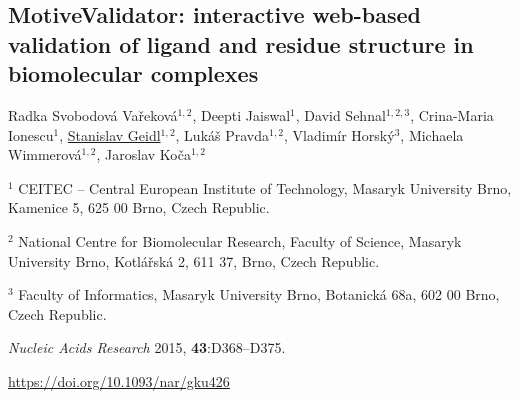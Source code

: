 \begin{center}
\section{\centering MotiveValidator: interactive
web-based validation of ligand and residue structure in biomolecular complexes}

Radka Svobodová Vařeková$^{1, 2}$,
Deepti Jaiswal$^1$,
David Sehnal$^{1, 2, 3}$,
Crina-Maria Ionescu$^1$,
\underline{Stanislav Geidl}$^{1, 2}$,
Lukáš Pravda$^{1, 2}$,
Vladimír Horský$^3$,
Michaela Wimmerová$^{1, 2}$,
Jaroslav Koča$^{1, 2}$

\vspace{1cm}

$^1$ CEITEC -- Central European Institute of Technology,
Masaryk University Brno, Kamenice 5, 625 00 Brno, Czech Republic.

$^2$ National Centre for Biomolecular Research, Faculty of Science,
Masaryk University Brno, Kotlářská 2, 611 37, Brno, Czech Republic.

$^3$ Faculty of Informatics, Masaryk University Brno, Botanická 68a, 602 00 Brno,
Czech Republic.

\vspace{1cm}

\textit{Nucleic Acids Research} 2015, \textbf{43}:D368--D375.

\vspace{1cm}

\url{https://doi.org/10.1093/nar/gku426}

\end{center}



